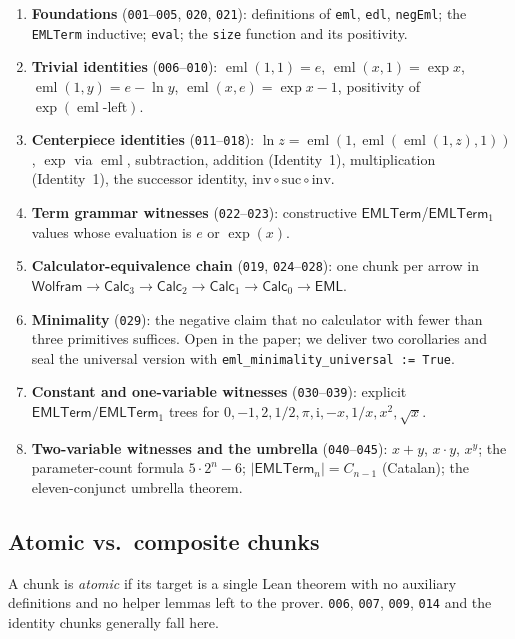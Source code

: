 \documentclass[11pt,a4paper]{article}
\theoremstyle{plain}
\theoremstyle{definition}
\newcommand{\eml}{\operatorname{eml}}
\newcommand{\imu}{\mathrm{i}}
\newcommand{\EMLT}{\mathsf{EMLTerm}}
\begin{document}
\begin{enumerate}[leftmargin=*]
\item \textbf{Foundations} (\texttt{001}--\texttt{005}, \texttt{020},
\texttt{021}): definitions of \texttt{eml}, \texttt{edl},
\texttt{negEml}; the \texttt{EMLTerm} inductive; \texttt{eval};
the \texttt{size} function and its positivity.
\item \textbf{Trivial identities} (\texttt{006}--\texttt{010}):
$\eml(1,1)=e$, $\eml(x,1)=\exp x$, $\eml(1,y)=e-\ln y$, $\eml(x,e)=\exp
x - 1$, positivity of $\exp(\eml\text{-left})$.
\item \textbf{Centerpiece identities} (\texttt{011}--\texttt{018}):
$\ln z = \eml(1,\eml(\eml(1,z),1))$, $\exp$ via $\eml$, subtraction,
addition (Identity~1), multiplication (Identity~1), the successor
identity, $\mathrm{inv}\circ\mathrm{suc}\circ\mathrm{inv}$.
\item \textbf{Term grammar witnesses} (\texttt{022}--\texttt{023}):
constructive $\EMLT$/$\EMLT_1$ values whose evaluation is $e$ or
$\exp(x)$.
\item \textbf{Calculator-equivalence chain} (\texttt{019},
\texttt{024}--\texttt{028}): one chunk per arrow in
$\mathsf{Wolfram}\to\mathsf{Calc}_3\to\mathsf{Calc}_2\to\mathsf{Calc}_1
\to\mathsf{Calc}_0\to\mathsf{EML}$.
\item \textbf{Minimality} (\texttt{029}): the negative claim that no
calculator with fewer than three primitives suffices.  Open in the
paper; we deliver two corollaries and seal the universal version with
\texttt{eml\_minimality\_universal := True}.
\item \textbf{Constant and one-variable witnesses}
(\texttt{030}--\texttt{039}): explicit $\EMLT/\EMLT_1$ trees for
$0,-1,2,1/2,\pi,\imu,-x,1/x,x^2,\sqrt{x}$.
\item \textbf{Two-variable witnesses and the umbrella}
(\texttt{040}--\texttt{045}): $x{+}y$, $x{\cdot}y$, $x^y$;
the parameter-count formula $5\cdot 2^n-6$;
$|\EMLT_n|=C_{n-1}$ (Catalan); the eleven-conjunct umbrella theorem.
\end{enumerate}

\subsection{Atomic vs.~composite chunks}

A chunk is \emph{atomic} if its target is a single Lean theorem with
no auxiliary definitions and no helper lemmas left to the prover.
\texttt{006}, \texttt{007}, \texttt{009}, \texttt{014} and the identity
chunks generally fall here.
\end{document}

